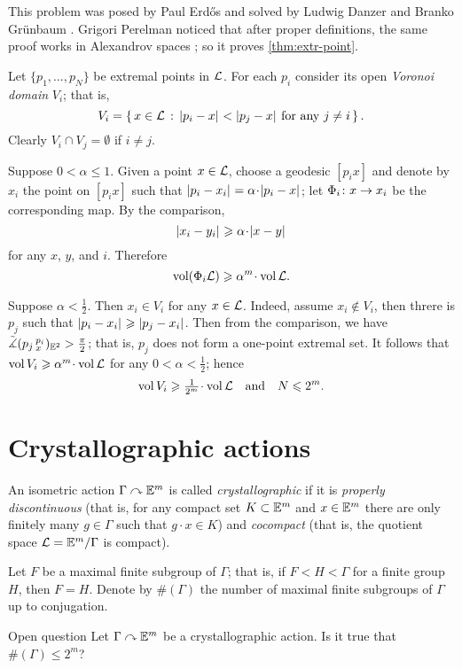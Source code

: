 This problem was posed by Paul Erdős \cite{erdos} and solved by Ludwig Danzer and Branko Gr\"unbaum \cite{danzer-gruenbaum}.
Grigori Perelman noticed that after proper definitions, the same proof works in Alexandrov spaces \cite{perelman-Erdos}; so it proves \ref{thm:extr-point}.

Let $\{p_1,\dots,p_N\}$ be extremal points in $\mathcal{L}$.
For each $p_i$ consider its open \emph{Voronoi domain} $V_i$; that is, 
\[V_i=\set{x\in \spc{L}}{\dist{p_i}{x}{}<\dist{p_j}{x}{}\ \text{for any}\ j\not=i}.\]
Clearly $V_i\cap V_j=\emptyset$ if $i\not=j$.

Suppose  $0<\alpha\le 1$.
Given a point $x\in\mathcal{L}$, choose a geodesic $[p_ix]$ and denote by $x_i$ the point on $[p_ix]$ such that $\dist{p_i}{x_i}{}=\alpha\cdot\dist{p_i}{x}{}$;
let $\Phi_i\colon x\to x_i$ be the corresponding map.
By the comparison, 
\[\dist{x_i}{y_i}{}\ge\alpha\cdot \dist{x}{y}{}\]
for any $x$, $y$, and $i$.
Therefore 
\[\vol(\map_i \spc{L})\ge\alpha^m\cdot\vol \spc{L}.\]

Suppose $\alpha<\tfrac12$.
Then $x_i\in V_i$ for any $x\in \mathcal{L}$.
Indeed, assume $x_i\notin V_i$,
then threre is $p_j$ such that $|{p_i}-{x_i}|_{}^{{}}\geqslant|{p_j}-{x_i}|_{}^{{}}$.
Then from the comparison, we have $\tilde\measuredangle(p_j\,{}^{p_i}_{x})_{\mathbb{E}^2}>\tfrac\pi2$;
that is, $p_j$ does not form a one-point extremal set.
It follows that $\vol V_i\ge\alpha^m\cdot\vol \spc{L}$
for any $0<\alpha<\tfrac12$; hence 
\[\vol V_i\ge\tfrac1{2^m}\cdot\vol \spc{L}\quad\text{and}\quad N\le 2^m.\]
\qedsf

\section{Crystallographic actions}


An isometric action $\Gamma\curvearrowright \mathbb{E}^m$ is called \emph{crystallographic} if it is 
\emph{properly discontinuous} (that is, for any compact set $K\subset \mathbb{E}^m$ and $x\in \mathbb{E}^m$ there are only finitely many $g\in \Gamma$ such that $g\cdot x\in K$) and \emph{cocompact} (that is, the quotient space $\mathcal{L}=\mathbb{E}^m/\Gamma$ is compact).

Let $F$ be a maximal finite subgroup of $\Gamma$;
that is, if $F<H<\Gamma$ for a finite group $H$, then $F=H$.
Denote by $\#(\Gamma)$ the number of maximal finite subgroups of $\Gamma$ up to conjugation.

\begin{thm}{Open question}
Let $\Gamma\curvearrowright \mathbb{E}^m$ be a crystallographic action.
Is it true that $\#(\Gamma)\le 2^m$?
\end{thm}

